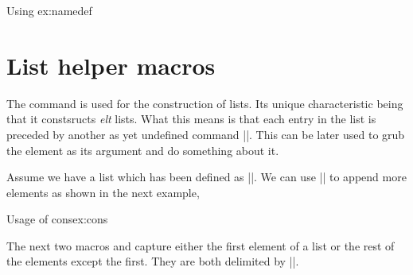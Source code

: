 \begin{texexample}{Using \string\@namedef}{ex:namedef}
\makeatletter
{}
\makeatother
\end{texexample}

\section{List helper macros}

\begin{macro}{\@cons} The command \cmd{\@cons} is used for the construction of lists. Its unique
characteristic being that it constsructs \emph{elt} lists. What this means is that each entry in the list is
preceded by another as yet undefined command |\@elt|. This can be later used to grub the element as
its argument and do something about it.

\begin{teX}
\def\@cons#1#2{\begingroup\let\@elt\relax\xdef#1{#1\@elt #2}\endgroup}
\end{teX}
\end{macro}

Assume we have a list \cmd{\mylist} which has been defined as ||.
We can use |\@cons| to append more elements as shown in the next example,

\begin{texexample}{Usage of cons}{ex:cons}
\makeatletter
\def\mylist{}
\@cons\mylist{one}
\@cons\mylist{two}
\def\@elt{\space}
\mylist
\makeatother
\end{texexample}


\begin{macro}{\@car}
\begin{macro}{\@cdr}
The next two macros \cmd{\@car} and \cmd{\@cdr} capture either the first element of a list or the rest of the elements
except the first. They are both delimited by |\@nil|.

\end{macro}
\end{macro}

